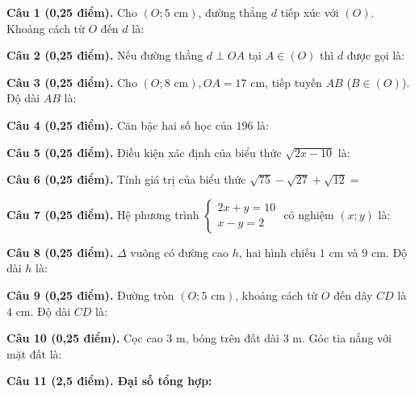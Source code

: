 \documentclass[12pt,a4paper]{article}
\begin{document}
\vspace{1.2mm}
\noindent\textbf{Câu 1 (0,25 điểm).} Cho $(O; 5\text{ cm})$, đường thẳng $d$ tiếp xúc với $(O)$. Khoảng cách từ $O$ đến $d$ là: \par\vspace{0.5mm}
\noindent\textbf{Câu 2 (0,25 điểm).} Nếu đường thẳng $d \perp OA$ tại $A \in (O)$ thì $d$ được gọi là: \par\vspace{0.5mm}
\noindent\textbf{Câu 3 (0,25 điểm).} Cho $(O; 8\text{ cm}), OA = 17\text{ cm}$, tiếp tuyến $AB$ ($B \in (O)$). Độ dài $AB$ là: \par\vspace{0.5mm}
\noindent\textbf{Câu 4 (0,25 điểm).} Căn bậc hai số học của $196$ là: \par\vspace{0.5mm}
\noindent\textbf{Câu 5 (0,25 điểm).} Điều kiện xác định của biểu thức $\sqrt{2x - 10}$ là: \par\vspace{0.5mm}
\noindent\textbf{Câu 6 (0,25 điểm).} Tính giá trị của biểu thức $\sqrt{75} - \sqrt{27} + \sqrt{12} = $ \par\vspace{0.5mm}
\noindent\textbf{Câu 7 (0,25 điểm).} Hệ phương trình $\begin{cases} 2x + y = 10 \\ x - y = 2 \end{cases}$ có nghiệm $(x; y)$ là: \par\vspace{0.5mm}
\noindent\textbf{Câu 8 (0,25 điểm).} $\Delta$ vuông có đường cao $h$, hai hình chiếu $1\text{ cm}$ và $9\text{ cm}$. Độ dài $h$ là: \par\vspace{0.5mm}
\noindent\textbf{Câu 9 (0,25 điểm).} Đường tròn $(O; 5\text{ cm})$, khoảng cách từ $O$ đến dây $CD$ là $4\text{ cm}$. Độ dài $CD$ là: \par\vspace{0.5mm}
\noindent\textbf{Câu 10 (0,25 điểm).} Cọc cao $3\text{ m}$, bóng trên đất dài $3\text{ m}$. Góc tia nắng với mặt đất là: \par\vspace{0.5mm}
\vspace{0.8mm}
\noindent\textbf{Câu 11 (2,5 điểm). Đại số tổng hợp:}
\vspace{0.6mm}
\end{document}
